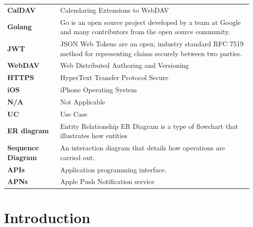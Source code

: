 \documentclass[12pt,a4paper]{report}
\begin{document}
\begin{singlespace}
\begin{center}
\begin{longtable}{p{}p{}}
    \textbf{CalDAV} & Calendaring Extensions to WebDAV \\[1ex]
    
    \textbf{Golang} & Go is an open source project developed by a team at Google and many contributors from the open source community. \cite{def:Golang}\\[1ex]
    
    \textbf{JWT} & JSON Web Tokens are an open, industry standard RFC 7519 method for representing claims securely between two parties. \cite{def:JWT}\\[1ex]
    
    \textbf{WebDAV} & Web Distributed Authoring and Versioning \\[1ex]
    
    \textbf{HTTPS} & HyperText Transfer Protocol Secure \\[1ex]
    
    \textbf{iOS} & iPhone Operating System \\[1ex]
    
    \textbf{N/A} & Not Applicable \\[1ex]
    
    \textbf{UC} & Use Case \\[1ex]
    
    \textbf{ER diagram} & Entity Relationship ER Diagram is a type of flowchart that illustrates how entities \\[1ex]
    
    \textbf{Sequence Diagram} & An interaction diagram that details how operations are carried out. \\[1ex]
    
    \textbf{APIs} & Application programming interface. \\[1ex]
    
    \textbf{APNs} & Apple Push Notification service \\
    
    \bottomrule
    \end{longtable}
\end{center}

\end{singlespace}


\chapter{Introduction}
\end{document}
